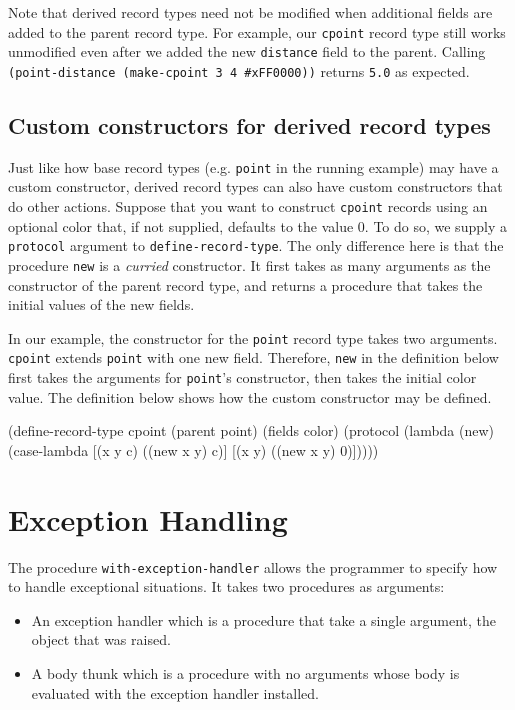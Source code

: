 \documentclass[onecolumn, 12pt, twoside, openright, dvipdfm]{book}
\begin{document}
Note that derived record types need not be modified when additional
fields are added to the parent record type.  For example, our
\texttt{cpoint} record type still works unmodified even after we
added the new \texttt{distance} field to the parent.  
Calling \texttt{(point-distance (make-cpoint 3 4 \#xFF0000))}
returns \texttt{5.0} as expected.

\subsection{Custom constructors for derived record types}

Just like how base record types (e.g. \texttt{point} in the running
example) may have a custom constructor, derived record types can
also have custom constructors that do other actions.  Suppose that
you want to construct \texttt{cpoint} records using an optional
color that, if not supplied, defaults to the value 0.  To do so, we
supply a \texttt{protocol} argument to \texttt{define-record-type}.
The only difference here is that the procedure \texttt{new} is a
\emph{curried} constructor.  It first takes as many arguments as the
constructor of the parent record type, and returns a procedure that
takes the initial values of the new fields.  

In our example, the constructor for the \texttt{point} record type
takes two arguments.  \texttt{cpoint} extends \texttt{point} with
one new field.  Therefore, \texttt{new} in the definition below
first takes the arguments for \texttt{point}'s constructor, then
takes the initial color value.  The definition below shows how the
custom constructor may be defined.

\begin{CodeInline}
(define-record-type cpoint
  (parent point) 
  (fields color) 
  (protocol
    (lambda (new) 
      (case-lambda 
        [(x y c) ((new x y) c)]
        [(x y)   ((new x y) 0)]))))
\end{CodeInline}


\section{Exception Handling}

The procedure \texttt{with-exception-handler} allows the programmer
to specify how to handle exceptional situations.  It takes two
procedures as arguments: 
\begin{itemize}
\item An exception handler which is a procedure that take a
single argument, the object that was raised.
\item A body thunk which is a procedure with no arguments whose body
is evaluated with the exception handler installed.
\end{itemize}
\end{document}
